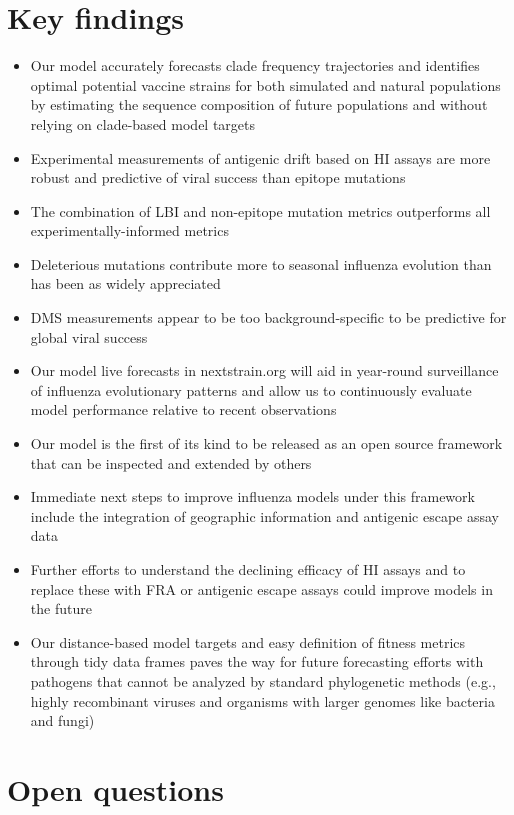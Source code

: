 \section*{Key findings}

\begin{itemize}
\item{Our model accurately forecasts clade frequency trajectories and identifies optimal potential vaccine strains for both simulated and natural populations by estimating the sequence composition of future populations and without relying on clade-based model targets}
\item{Experimental measurements of antigenic drift based on HI assays are more robust and predictive of viral success than epitope mutations}
\item{The combination of LBI and non-epitope mutation metrics outperforms all experimentally-informed metrics}
\item{Deleterious mutations contribute more to seasonal influenza evolution than has been as widely appreciated}
\item{DMS measurements appear to be too background-specific to be predictive for global viral success}
\item{Our model live forecasts in nextstrain.org will aid in year-round surveillance of influenza evolutionary patterns and allow us to continuously evaluate model performance relative to recent observations}
\item{Our model is the first of its kind to be released as an open source framework that can be inspected and extended by others}
\item{Immediate next steps to improve influenza models under this framework include the integration of geographic information and antigenic escape assay data}
\item{Further efforts to understand the declining efficacy of HI assays and to replace these with FRA or antigenic escape assays could improve models in the future}
\item{Our distance-based model targets and easy definition of fitness metrics through tidy data frames paves the way for future forecasting efforts with pathogens that cannot be analyzed by standard phylogenetic methods (e.g., highly recombinant viruses and organisms with larger genomes like bacteria and fungi)}
\end{itemize}

\section*{Open questions}

